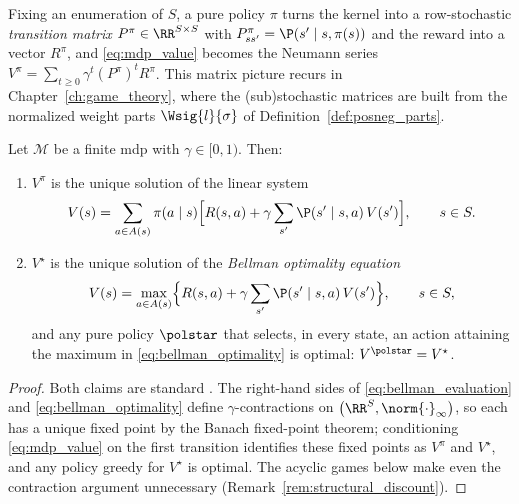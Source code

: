 Fixing an enumeration of $S$, a pure policy $\pi$ turns the kernel into a row-stochastic \emph{transition matrix} $P^{\pi} \in \RR^{S \times S}$ with $P^{\pi}_{s s'} = \P(s' \mid s, \pi(s))$ and the reward into a vector $R^{\pi}$, and \eqref{eq:mdp_value} becomes the Neumann series $V^{\pi} = \sum_{t \ge 0} \gamma^t (P^{\pi})^t R^{\pi}$. This matrix picture recurs in Chapter~\ref{ch:game_theory}, where the (sub)stochastic matrices are built from the normalized weight parts $\Wsig{l}{\sigma}$ of Definition~\ref{def:posneg_parts}.

\begin{proposition}\label{prop:bellman}
Let $\mathcal{M}$ be a finite \ac{mdp} with $\gamma \in [0,1)$. Then:
\begin{enumerate}
	\item $V^{\pi}$ is the unique solution of the linear system
	\begin{equation}
		V(s) = \sum_{a \in A(s)} \pi(a \mid s) \Bigl[ R(s,a) + \gamma \sum_{s'} \P(s' \mid s, a)\, V(s') \Bigr],
		\qquad s \in S.
		\label{eq:bellman_evaluation}
	\end{equation}
	\item $V^{\star}$ is the unique solution of the \emph{Bellman optimality equation}
	\begin{equation}
		V(s) = \max_{a \in A(s)} \Bigl\{ R(s, a) + \gamma \sum_{s'} \P(s' \mid s, a)\, V(s') \Bigr\},
		\qquad s \in S,
		\label{eq:bellman_optimality}
	\end{equation}
	and any pure policy $\polstar$ that selects, in every state, an action attaining the maximum in \eqref{eq:bellman_optimality} is optimal: $V^{\polstar} = V^{\star}$.
\end{enumerate}
\hfill{}
\end{proposition}

\begin{proof}
Both claims are standard \cite{Puterman1994mdp,SuttonBarto2018rl}. The right-hand sides of \eqref{eq:bellman_evaluation} and \eqref{eq:bellman_optimality} define $\gamma$-contractions on $\bigl(\RR^{S}, \norm{\cdot}_{\infty}\bigr)$, so each has a unique fixed point by the Banach fixed-point theorem; conditioning \eqref{eq:mdp_value} on the first transition identifies these fixed points as $V^{\pi}$ and $V^{\star}$, and any policy greedy for $V^{\star}$ is optimal. The acyclic games below make even the contraction argument unnecessary (Remark~\ref{rem:structural_discount}).
\end{proof}

